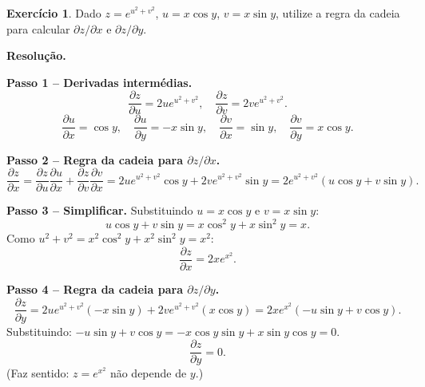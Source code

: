 \documentclass[12pt,a4paper]{article}
\theoremstyle{definition}
\newtheorem{exercise}{Exercício}[section]
\theoremstyle{remark}
\begin{document}
\begin{exercise}
  Dado $z = e^{u^2+v^2}$, $u = x\cos y$, $v = x\sin y$, utilize a regra
  da cadeia para calcular $\partial z/\partial x$ e $\partial z/\partial y$.

  \medskip\textbf{Resolução.}

  \textbf{Passo 1 -- Derivadas intermédias.}
  \[
    \frac{\partial z}{\partial u}=2ue^{u^2+v^2},\quad
    \frac{\partial z}{\partial v}=2ve^{u^2+v^2}.
  \]
  \[
    \frac{\partial u}{\partial x}=\cos y,\quad
    \frac{\partial u}{\partial y}=-x\sin y,\quad
    \frac{\partial v}{\partial x}=\sin y,\quad
    \frac{\partial v}{\partial y}=x\cos y.
  \]

  \textbf{Passo 2 -- Regra da cadeia para $\partial z/\partial x$.}
  \[
    \frac{\partial z}{\partial x}
    = \frac{\partial z}{\partial u}\frac{\partial u}{\partial x}
    + \frac{\partial z}{\partial v}\frac{\partial v}{\partial x}
    = 2ue^{u^2+v^2}\cos y + 2ve^{u^2+v^2}\sin y
    = 2e^{u^2+v^2}(u\cos y + v\sin y).
  \]

  \textbf{Passo 3 -- Simplificar.} Substituindo $u=x\cos y$ e $v=x\sin y$:
  \[
    u\cos y+v\sin y = x\cos^2 y + x\sin^2 y = x.
  \]
  Como $u^2+v^2=x^2\cos^2 y+x^2\sin^2 y=x^2$:
  \[
    \frac{\partial z}{\partial x} = 2xe^{x^2}.
  \]

  \textbf{Passo 4 -- Regra da cadeia para $\partial z/\partial y$.}
  \[
    \frac{\partial z}{\partial y}
    = 2ue^{u^2+v^2}(-x\sin y) + 2ve^{u^2+v^2}(x\cos y)
    = 2xe^{x^2}(-u\sin y+v\cos y).
  \]
  Substituindo: $-u\sin y+v\cos y = -x\cos y\sin y+x\sin y\cos y = 0$.
  \[
    \frac{\partial z}{\partial y} = 0.
  \]
  (Faz sentido: $z=e^{x^2}$ não depende de $y$.)
\end{exercise}
\end{document}
